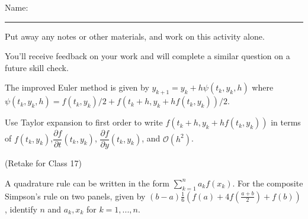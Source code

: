 \documentclass[12pt,letterpaper,noanswers]{exam}
\begin{document}
 \pdfpageheight 11in 
  \pdfpagewidth 8.5in

\noindent Name: \rule{2.5in}{0.5pt}

\noindent Put away any notes or other materials, and work on this activity alone.

\noindent You'll receive feedback on your work and will complete a similar question on a future skill check.


\begin{questions}
\item 
The improved Euler method is given by $y_{k+1} = y_k + h\psi(t_k,y_k,h)$ where $\psi(t_k,y_k,h) = f(t_k,y_k)/2+f(t_k+h,y_k+hf(t_k,y_k))/2$.

Use Taylor expansion to first order to write $f(t_k+h,y_k+hf(t_k,y_k))$ in terms of $f(t_k, y_k)$,$\dfrac{\partial f}{\partial t}(t_k,y_k)$, $\dfrac{\partial f}{\partial y}(t_k,y_k)$, and $\mathcal{O}(h^2)$.

\vspace{8.5cm}

\item (Retake for Class 17)

A quadrature rule can be written in the form $\sum\limits_{k=1}^n a_k f(x_k)$. For the composite Simpson's rule on two panels, given by $( b-a)\frac{1}{6}\left(f(a)+4f(\frac{a+b}{2})+f(b)\right)$, identify $n$ and $a_k, x_k$ for $k=1,...,n$.

\end{questions}
\end{document}
